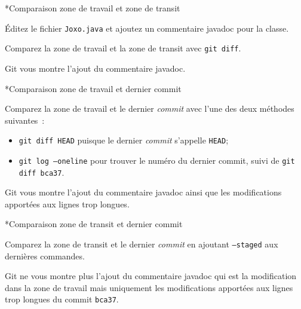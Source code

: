 \documentclass[a4paper,11pt]{style-esi/td}
\begin{document}
\begin{Exercice}*{Comparaison zone de travail et zone de transit}
	\begin{steps}
		
	\item Éditez le fichier \texttt{Joxo.java} et ajoutez un commentaire javadoc
		pour la classe. 
	\item Comparez la zone de travail et la zone de transit avec \texttt{git diff}.
	
		Git vous montre l'ajout du commentaire javadoc.    

	\end{steps}
	
	
\end{Exercice}

\pagebreak
\begin{Exercice}*{Comparaison zone de travail et dernier commit}
	\begin{steps}
		
		\item Comparez la zone de travail et le dernier \textit{commit} avec l'une des
			deux méthodes suivantes : 
			\begin{itemize}
				\item \texttt{git diff HEAD} puisque le dernier \textit{commit} s'appelle 
					\texttt{HEAD};
				\item \texttt{git log --oneline} pour trouver le numéro du dernier
					commit, suivi de \texttt{git diff bca37}.
			\end{itemize}

			Git vous montre l'ajout du commentaire javadoc ainsi que les 
			modifications apportées aux lignes trop longues. 

	\end{steps}
	
\end{Exercice}

\begin{Exercice}*{Comparaison zone de transit et dernier commit}
	\begin{steps}
		
		\item Comparez la zone de transit et le dernier \textit{commit} en ajoutant 
			\texttt{--staged} aux dernières commandes. 

			Git ne vous montre plus l'ajout du commentaire javadoc qui est la
			modification dans la zone de travail mais uniquement les
			modifications apportées aux lignes trop longues du commit
			\texttt{bca37}. 

	\end{steps}
	
\end{Exercice}
\end{document}
